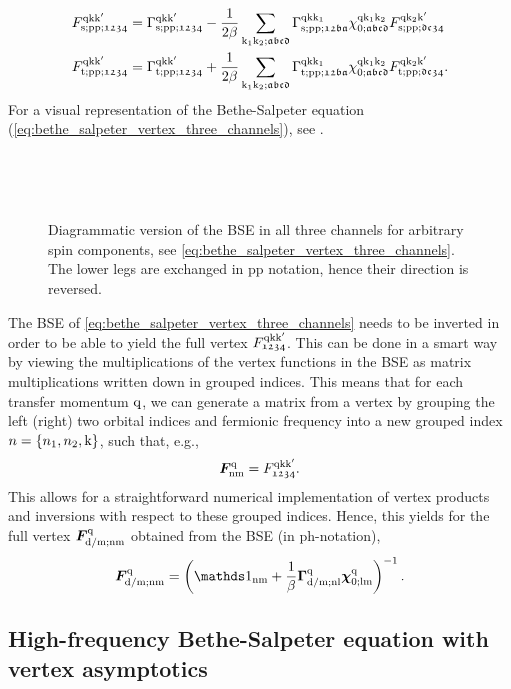 \documentclass[../../main.tex]{subfiles}
\begin{document}
\begin{align}
	F_{\text{s};\text{pp};\mathfrak{1234}}^{\text{q}\text{k}\text{k}'}&=\Gamma_{\text{s};\text{pp};\mathfrak{1234}}^{\text{q}\text{k}\text{k}'}-\frac{1}{2\beta}\sum_{\text{k}_1\text{k}_2;\mathfrak{abcd}} \Gamma_{\text{s};\text{pp};\mathfrak{12ba}}^{\text{q}\text{k}\text{k}_1} \chi_{0;\mathfrak{abcd}}^{\text{q}\text{k}_1\text{k}_2} F_{\text{s};\text{pp};\mathfrak{dc34}}^{\text{q}\text{k}_2\text{k}'}\\
	F_{\text{t};\text{pp};\mathfrak{1234}}^{\text{q}\text{k}\text{k}'}&=\Gamma_{\text{t};\text{pp};\mathfrak{1234}}^{\text{q}\text{k}\text{k}'}+\frac{1}{2\beta}\sum_{\text{k}_1\text{k}_2;\mathfrak{abcd}} \Gamma_{\text{t};\text{pp};\mathfrak{12ba}}^{\text{q}\text{k}\text{k}_1} \chi_{0;\mathfrak{abcd}}^{\text{q}\text{k}_1\text{k}_2} F_{\text{t};\text{pp};\mathfrak{dc34}}^{\text{q}\text{k}_2\text{k}'}.
\end{align}
For a visual representation of the Bethe-Salpeter equation (\ref{eq:bethe_salpeter_vertex_three_channels}), see .
\begin{figure}[ht!]
  \centering
  \parbox{\textwidth}{
    \subfloat{}
  }\\[1cm]
  \parbox{\textwidth}{
    \subfloat{}
  }\\[1cm]
  \parbox{\textwidth}{
    \subfloat{}
  }
  \caption{Diagrammatic version of the BSE in all three channels for arbitrary spin components, see \eqref{eq:bethe_salpeter_vertex_three_channels}. The lower legs are exchanged in pp notation, hence their direction is reversed.}
  \label{fig:bethe_salpeter_diagrammatic}
\end{figure}
The BSE of \eqref{eq:bethe_salpeter_vertex_three_channels} needs to be inverted in order to be able to yield the full vertex $F_{\mathfrak{1234}}^{\text{q}\text{k}\text{k}'}$. This can be done in a smart way by viewing the multiplications of the vertex functions in the BSE as matrix multiplications written down in grouped indices. This means that for each transfer momentum $\text{q}$, we can generate a matrix from a vertex by grouping the left (right) two orbital indices and fermionic frequency into a new grouped index $n=\{n_1, n_2, \text{k}\}$, such that, e.g., \cite{ab initio dyn} 
\begin{align}
	\bm{F}^{\text{q}}_{\text{nm}}=F^{\text{q}\text{k}\text{k}'}_{\mathfrak{1234}}.
\end{align}
This allows for a straightforward numerical implementation of vertex products and inversions with respect to these grouped indices. Hence, this yields for the full vertex $\bm{F}^{\text{q}}_{\text{d}/\text{m};\text{nm}}$ obtained from the BSE (in ph-notation),
\begin{align}
	\bm{F}^{\q}_{\dens/\magn;\text{nm}}=\left (\unity_{\text{nm}} +\frac1\beta \bm{\Gamma}^{\q}_{\dens/\magn;\text{nl}}\bm{\chi}^{\q}_{0;\text{lm}}\right )^{-1}.
\end{align}

\subsection{High-frequency Bethe-Salpeter equation with vertex asymptotics}
\end{document}
